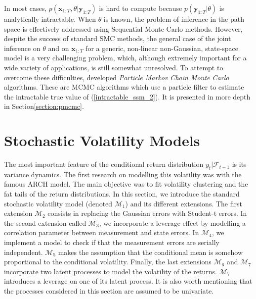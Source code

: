 \documentclass[11pt,a4,twosided,singlespacing,titlepagenumber=on]{scrreprt}
\numberwithin{equation}{chapter} %
\theoremstyle{remark}
\newcommand{\matr}[1]{\mathbf{#1}}
\begin{document}
In most cases, $p(\matr{x}_{1:T}, \theta | \matr{y}_{1:T})$ is hard to compute because $p(\matr{y}_{1:T} | \theta)$ is analytically intractable. When $\theta$ is known, the problem of inference in the path space is effectively addressed using Sequential Monte Carlo methods. However, despite the success of standard SMC methods, the general case of the joint inference on $\theta$ and on $\matr{x}_{1:T}$ for a generic, non-linear non-Gaussian, state-space model is a very challenging problem, which, although extremely important for a wide variety of applications, is still somewhat unresolved. To attempt to overcome these difficulties, \cite{andrieu2010} developed \textit{Particle Markov Chain Monte Carlo} algorithms. These are MCMC algorithms which use a particle filter to estimate the intractable true value of (\ref{intractable_ssm_2}). It is presented in more depth in Section\ref{section:pmcmc}.

\section{Stochastic Volatility Models}
\label{sec:sv}
The most important feature of the conditional return distribution $y_t | \mathcal{F}_{t-1}$ is its variance dynamics. The first research on modelling this volatility was \cite{engle1982} with the famous ARCH model. The main objective was to fit volatility clustering and the fat tails of the return distributions. In this section, we introduce the standard stochastic volatility model (denoted $\mathcal{M}_1$) and its different extensions. The first extension $\mathcal{M}_2$ consists in replacing the Gaussian errors with Student-t errors. In the second extension called $\mathcal{M}_3$, we incorporate a leverage effect by modelling a correlation parameter between measurement and state errors. In $\mathcal{M}_4$, we implement a model to check if that the measurement errors are serially independent. $\mathcal{M}_5$ makes the assumption that the conditional mean is somehow proportional to the conditional volatility. Finally, the last extensions $\mathcal{M}_6$ and $\mathcal{M}_7$ incorporate two latent processes to model the volatility of the returns. $\mathcal{M}_7$ introduces a leverage on one of its latent process. It is also worth mentioning that the processes considered in this section are assumed to be univariate.
\end{document}
